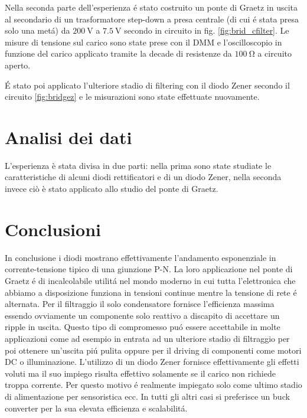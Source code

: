 \documentclass{article}
\begin{document}
Nella seconda parte dell'esperienza \'e stato costruito un ponte di Graetz in uscita al secondario di un trasformatore step-down a presa centrale (di cui \'e stata presa solo una met\'a) da $\SI{200}{\volt}$ a $\SI{7.5}{\volt}$ secondo in circuito in fig. \ref{fig:brid_cfilter}. Le misure di tensione sul carico sono state prese con il DMM e l'oscilloscopio in funzione del carico applicato tramite la decade di resistenze da $\SI{100}{\ohm}$ a circuito aperto.

\'E stato poi applicato l'ulteriore stadio di filtering con il diodo Zener secondo il circuito \ref{fig:bridgez} e le misurazioni sono state effettuate nuovamente.

\newpage

\section{Analisi dei dati}

L'esperienza è stata divisa in due parti: nella prima sono state studiate le caratteristiche di alcuni diodi rettificatori e di un diodo Zener, nella seconda invece ciò è stato applicato allo studio del ponte di Graetz.





\newpage

\section{Conclusioni}
In conclusione i diodi mostrano effettivamente l'andamento esponenziale in corrente-tensione tipico di una giunzione P-N.
La loro applicazione nel ponte di Graetz \'e di incalcolabile utilit\'a nel mondo moderno in cui tutta l'elettronica che abbiamo a disposizione funziona in tensioni continue mentre la tensione di rete \'e alternata.
Per il filtraggio il solo condensatore fornisce l'efficienza massima essendo ovviamente un componente solo reattivo a discapito di accettare un ripple in uscita. Questo tipo di compromesso pu\'o essere accettabile in molte applicazioni come ad esempio in entrata ad un ulteriore stadio di filtraggio per poi ottenere un'uscita pi\'u pulita oppure per il driving di componenti come motori DC o illuminazione.
L'utilizzo di un diodo Zener fornisce effettivamente gli effetti voluti ma il suo impiego risulta effettivo solamente se il carico non richiede troppa corrente. Per questo motivo \'e realmente impiegato solo come ultimo stadio di alimentazione per sensoristica ecc. In tutti gli altri casi si preferisce un buck converter per la sua elevata efficienza e scalabilit\'a.
\end{document}
